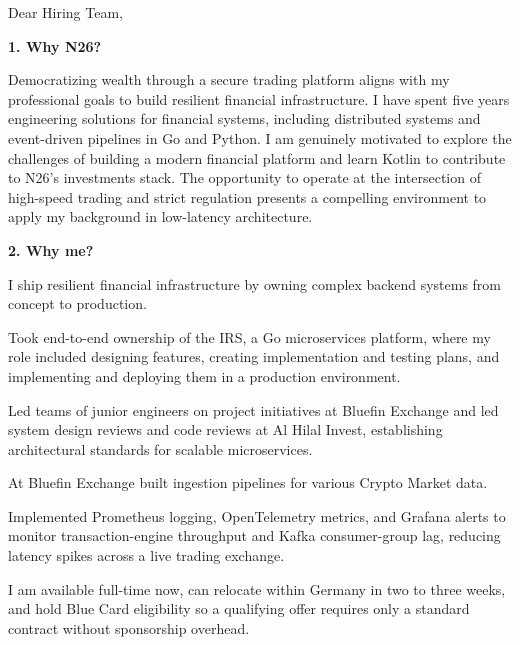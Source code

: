 \documentclass[11pt,a4paper]{coverletter}
\begin{document}

\opening{Dear Hiring Team,}

\vspace{8pt}\noindent\textbf{1. Why N26?}\par\vspace{3pt}

Democratizing wealth through a secure trading platform aligns with my professional goals to build resilient financial infrastructure. I have spent five years engineering solutions for financial systems, including distributed systems and event-driven pipelines in Go and Python. I am genuinely motivated to explore the challenges of building a modern financial platform and learn Kotlin to contribute to N26’s investments stack. The opportunity to operate at the intersection of high-speed trading and strict regulation presents a compelling environment to apply my background in low-latency architecture.

\vspace{8pt}\noindent\textbf{2. Why me?}\par\vspace{3pt}

I ship resilient financial infrastructure by owning complex backend systems from concept to production.

\bullets

  \item Took end-to-end ownership of the IRS, a Go microservices platform, where my role included designing features, creating implementation and testing plans, and implementing and deploying them in a production environment.

  \item Led teams of junior engineers on project initiatives at Bluefin Exchange and led system design reviews and code reviews at Al Hilal Invest, establishing architectural standards for scalable microservices.

  \item At Bluefin Exchange built ingestion pipelines for various Crypto Market data.

  \item Implemented Prometheus logging, OpenTelemetry metrics, and Grafana alerts to monitor transaction-engine throughput and Kafka consumer-group lag, reducing latency spikes across a live trading exchange.

\bulletsend

I am available full-time now, can relocate within Germany in two to three weeks, and hold Blue Card eligibility so a qualifying offer requires only a standard contract without sponsorship overhead.
\end{document}
